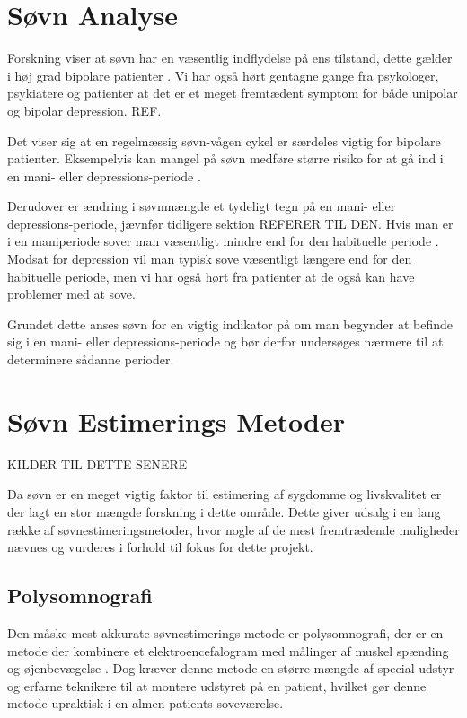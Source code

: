 \section{Søvn Analyse}
Forskning viser at søvn har en væsentlig indflydelse på ens tilstand, dette gælder i høj grad bipolare patienter \citep{CPSP:CPSP1164}.
Vi har også hørt gentagne gange fra psykologer, psykiatere og patienter at det er et meget fremtædent symptom for både unipolar og bipolar depression. REF.

Det viser sig at en regelmæssig søvn-vågen cykel er særdeles vigtig for bipolare patienter.
Eksempelvis kan mangel på søvn medføre større risiko for at gå ind i en mani- eller depressions-periode \citep{CPSP:CPSP1164}.

Derudover er ændring i søvnmængde et tydeligt tegn på en mani- eller depressions-periode, jævnfør tidligere sektion REFERER TIL DEN.
Hvis man er i en maniperiode sover man væsentligt mindre end for den habituelle periode \citep{CPSP:CPSP1164}.
Modsat for depression vil man typisk sove væsentligt længere end for den habituelle periode, men vi har også hørt fra patienter at de også kan have problemer med at sove.

Grundet dette anses søvn for en vigtig indikator på om man begynder at befinde sig i en mani- eller depressions-periode og bør derfor undersøges nærmere til at determinere sådanne perioder.

\section{Søvn Estimerings Metoder}
KILDER TIL DETTE SENERE

Da søvn er en meget vigtig faktor til estimering af sygdomme og livskvalitet er der lagt en stor mængde forskning i dette område.
Dette giver udsalg i en lang række af søvnestimeringsmetoder, hvor nogle af de mest fremtrædende muligheder nævnes og vurderes i forhold til fokus for dette projekt.

\subsection{Polysomnografi}
Den måske mest akkurate søvnestimerings metode er polysomnografi, der er en metode der kombinere et elektroencefalogram med målinger af muskel spænding og øjenbevægelse \citep{misc:polysomnografi} \citep{misc:polysomnography}.
Dog kræver denne metode en større mængde af special udstyr og erfarne teknikere til at montere udstyret på en patient, hvilket gør denne metode upraktisk i en almen patients soveværelse.

